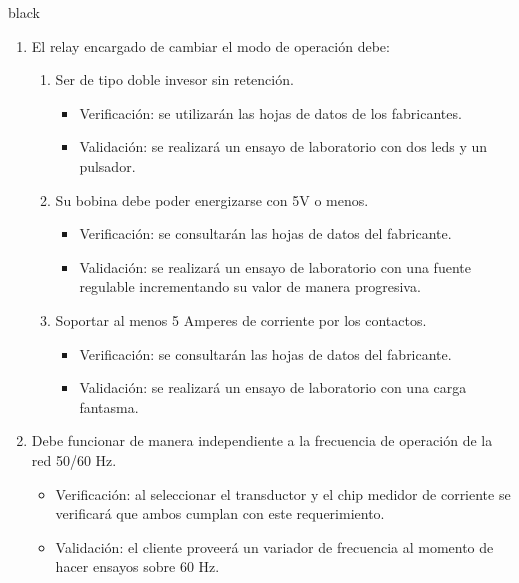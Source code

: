 \documentclass[11pt]{charter}
\begin{document}
\begin{consigna}{black}
\begin{enumerate}
\begin{enumerate}[label*=\arabic*.]
			\item El relay encargado de cambiar el modo de operación debe:
			\begin{enumerate}[label*=\arabic*.]
				\item Ser de tipo doble invesor sin retención.
					\begin{itemize}
						\item Verificación: se utilizarán las hojas de datos de los fabricantes.\\
						\item Validación: se realizará un ensayo de laboratorio con dos leds y un pulsador.\\
					\end{itemize}
				\item Su bobina debe poder energizarse con 5V o menos.
					\begin{itemize}
						\item Verificación: se consultarán las hojas de datos del fabricante.\\
						\item Validación: se realizará un ensayo de laboratorio con una fuente regulable incrementando su valor de manera progresiva.\\
					\end{itemize}
				\item Soportar al menos 5 Amperes de corriente por los contactos.
					\begin{itemize}
						\item Verificación: se consultarán las hojas de datos del fabricante.\\
						\item Validación: se realizará un ensayo de laboratorio con una carga fantasma.\\
					\end{itemize}
			\end{enumerate}
			
			\item Debe funcionar de manera independiente a la frecuencia de operación de la red 50/60 Hz.
				\begin{itemize}
					\item Verificación: al seleccionar el transductor y el chip medidor de corriente se verificará que ambos cumplan con este requerimiento.\\
					\item Validación: el cliente proveerá un variador de frecuencia al momento de hacer ensayos sobre 60 Hz.\\
				\end{itemize}
			

\end{enumerate}
\end{enumerate}
\end{consigna}
\end{document}
